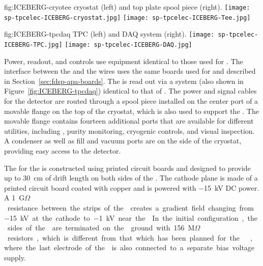 \begin{dunefigure}
{fig:ICEBERG-cryotee}
{ cryostat (left) and top plate spool piece (right).}
\texttt{[image: sp-tpcelec-ICEBERG-cryostat.jpg]}
\texttt{[image: sp-tpcelec-ICEBERG-Tee.jpg]}
\end{dunefigure}

\begin{dunefigure}
{fig:ICEBERG-tpcdaq}
{ TPC (left) and DAQ system (right).}
\texttt{[image: sp-tpcelec-ICEBERG-TPC.jpg]}
\texttt{[image: sp-tpcelec-ICEBERG-DAQ.jpg]}
\end{dunefigure}

Power, readout, and controls use equipment identical to those used for . The
interface between the  and the  wires uses the same  boards
used for  and described in Section~\ref{sec:fdsp-apa-boards}. The  is
read out via a  system (also shown in Figure~\ref{fig:ICEBERG-tpcdaq})
identical to that of . The power and signal cables for the detector 
are routed through a spool piece installed on the center port of a movable flange on the 
top of the cryostat, which is also used to support the . The movable 
flange contains fourteen additional ports that are available for different utilities, 
including , purity monitoring, cryogenic controls, and visual inspection. 
A condenser as well as  fill and vacuum ports are on the side of the cryostat, 
providing easy access to the detector.

The  for the  is constructed using printed circuit boards and 
designed to provide  up to \SI{30}{cm} of drift length on both sides of the . The cathode 
plane is made of a printed circuit board coated with copper and is powered with 
\SI{-15}{kV} DC power. A \SI{1}{G$\Omega$} resistance between the strips of the 
creates a gradient field changing from \SI{-15}{kV} at the cathode to \SI{-1}{kV} near the 
. In the initial configuration, the sides of the  are terminated on the 
ground with \SI{156}{M$\Omega$} resistors, which is different from that which has been
planned for the  , where the last electrode of the  is also connected to
a separate bias voltage supply. 

